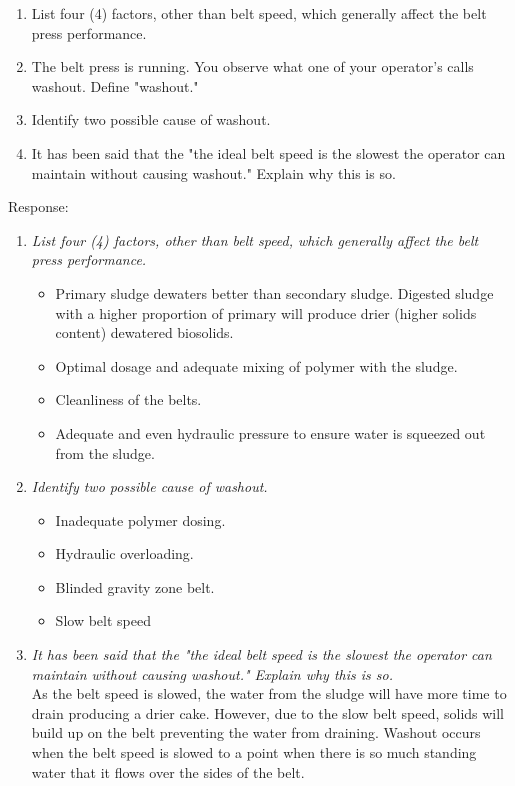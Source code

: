 \begin{enumerate}
\begin{enumerate}
\item List four (4) factors, other than belt speed, which generally affect the belt press performance.
\item The belt press is running. You observe what one of your operator’s calls washout. Define "washout." 
\item Identify two possible cause of washout.
\item It has been said that the "the ideal belt speed is the slowest the operator can maintain without causing washout." Explain why this is so.
\end{enumerate}
Response:\\
\begin{enumerate}[label=\alph*]
\item \textit{List four (4) factors, other than belt speed, which generally affect the belt press performance.}
\begin{itemize}
\item Primary sludge dewaters better than secondary sludge.  Digested sludge with a higher proportion of primary will produce drier (higher solids content) dewatered biosolids.
\item Optimal dosage and adequate mixing of polymer with the sludge. 
\item Cleanliness of the belts.
\item Adequate and even hydraulic pressure to ensure water is squeezed out from the sludge.
\end{itemize}
\item \textit{Identify two possible cause of washout.}
\begin{itemize}
\item Inadequate polymer dosing.
\item Hydraulic overloading.
\item Blinded gravity zone belt.
\item Slow belt speed
\end{itemize}
\item \textit{It has been said that the "the ideal belt speed is the slowest the operator can maintain without causing washout." Explain why this is so.}\\
As the belt speed is slowed, the water from the sludge will have more time to drain producing a drier cake.  However, due to the slow belt speed, solids will build up on the belt preventing the water from draining.  Washout occurs when the belt speed is slowed to a point when there is so much standing water that it flows over the sides of the belt.
	
\end{enumerate}


\end{enumerate}
